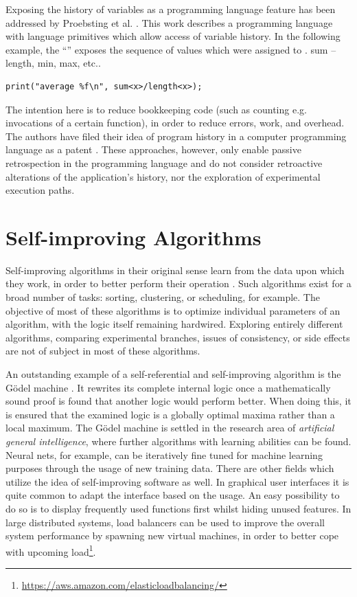 Exposing the history of variables as a programming language feature has been 
addressed by Proebsting et al. \cite{Proebsting2000}. This work describes a 
programming language with language primitives which allow access of variable 
history.
In the following example, the ``'' exposes the sequence of values 
which were assigned to . %
sum -- length, min, max, etc..

\begin{lstlisting}[style=stylec]
print("average %f\n", sum<x>/length<x>);
\end{lstlisting}

The intention here is to reduce bookkeeping code (such as counting e.g. 
invocations of a certain function), in order to reduce errors, work, and 
overhead. The authors have filed their idea of program history in a computer 
programming language as a patent \cite{Fraser2006}.
These approaches, however, only enable passive retrospection in the programming 
language and do not consider retroactive alterations of the application's 
history, nor the exploration of experimental execution paths.

\section{Self-improving Algorithms}
Self-improving algorithms in their original sense learn from the data upon which 
they work, in order to better perform their operation \cite{Ailon2011}. Such 
algorithms exist for a broad number of tasks: sorting, clustering, or scheduling,
for example. The objective of most of these algorithms is to optimize individual 
parameters of an algorithm, with the logic itself remaining hardwired. Exploring 
entirely different algorithms, comparing experimental branches, issues of 
consistency, or side effects are not of subject in most of these algorithms.

An outstanding example of a self-referential and self-improving algorithm is the 
G\"odel machine \cite{Schmidhuber2007}. It rewrites its complete internal logic 
once a mathematically sound proof is found that another logic would perform 
better. When doing this, it is ensured that the examined logic is a globally 
optimal maxima rather than a local maximum. 
The G\"odel machine is settled in the research area of \emph{artificial general 
intelligence}, where further algorithms with learning abilities can be found.
Neural nets, for example, can be iteratively fine tuned for machine learning 
purposes through the usage of new training data.
There are other fields which utilize the idea of self-improving software as well. 
In graphical user interfaces it is quite common to adapt the interface based on 
the usage. An easy possibility to do so is to display frequently used functions 
first whilst hiding unused features.
In large distributed systems, load balancers can be used to improve the overall 
system performance by spawning new virtual machines, in order to better cope 
with upcoming load\footnote[1]{\href{https://aws.amazon.com/elasticloadbalancing/}{https://aws.amazon.com/elasticloadbalancing/}}.

